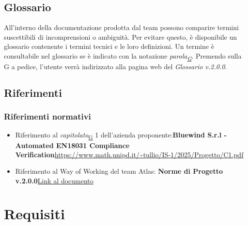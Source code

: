 \documentclass[a4paper,12pt]{article}
\begin{document}
    \subsection{Glossario}
        All'interno della documentazione prodotta dal team possono comparire termini suscettibili di incomprensioni o ambiguità. Per evitare questo, è disponibile un glossario
        contenente i termini tecnici e le loro definizioni. Un termine è consultabile nel glossario se è indicato con la notazione \textit{parola\textsubscript{\href{https://atlasteam9.github.io/Atlas/glossario.html}{G}}}.
        Premendo sulla G a pedice, l'utente verrà indirizzato alla pagina web del \textit{Glossario v.2.0.0}.
    

    \subsection{Riferimenti}
        \subsubsection{Riferimenti normativi}
            \begin{itemize}
                \item Riferimento al \textit{capitolato}\textsubscript{\href{https://atlasteam9.github.io/Atlas/glossario.html\#Capitolato}{G}} 1 dell'azienda proponente:\newline \textbf{Bluewind S.r.l - Automated EN18031 Compliance Verification}\newline \url{https://www.math.unipd.it/~tullio/IS-1/2025/Progetto/C1.pdf}
                \item Riferimento al Way of Working del team Atlas: \newline \textbf{Norme di Progetto v.2.0.0}\newline \href{https://atlasteam9.github.io/Atlas/docs/PB/documenti/interni/Norme%20di%20Progetto.pdf}{Link al documento} 
            \end{itemize}

\newpage
\section{Requisiti}
\end{document}
